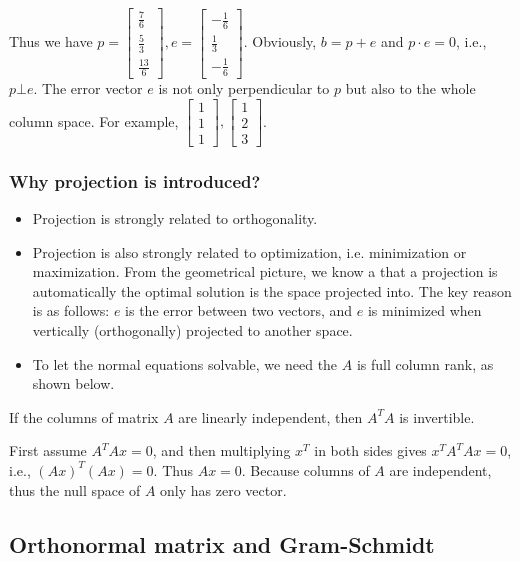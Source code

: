 \documentclass[11pt]{article}
\providecommand{\tightlist}{%
      \setlength{\itemsep}{0pt}\setlength{\parskip}{0pt}}
\begin{document}
Thus we have
\(p=\begin{bmatrix}\frac{7}{6}\\\frac{5}{3}\\\frac{13}{6}\end{bmatrix}, e=\begin{bmatrix}-\frac{1}{6}\\\frac{1}{3}\\-\frac{1}{6}\end{bmatrix}\).
Obviously, \(b=p+e\) and \(p\cdot e=0\), i.e., \(p\bot e\). The error
vector \(e\) is not only perpendicular to \(p\) but also to the whole
column space. For example,
\(\begin{bmatrix}1\\1\\1\end{bmatrix}, \begin{bmatrix}1\\2\\3\end{bmatrix}\).

    \subsubsection{Why projection is
introduced?}\label{why-projection-is-introduced}

\begin{itemize}
\tightlist
\item
  Projection is strongly related to orthogonality.
\item
  Projection is also strongly related to optimization, i.e. minimization
  or maximization. From the geometrical picture, we know a that a
  projection is automatically the optimal solution is the space
  projected into. The key reason is as follows: \(e\) is the error
  between two vectors, and \(e\) is minimized when vertically
  (orthogonally) projected to another space.
\item
  To let the normal equations solvable, we need the \(A\) is full column
  rank, as shown below.
\end{itemize}

If the columns of matrix \(A\) are linearly independent, then \(A^TA\)
is invertible.

First assume \(A^TAx=0\), and then multiplying \(x^T\) in both sides
gives \(x^TA^TAx=0\), i.e., \((Ax)^T(Ax)=0\). Thus \(Ax=0\). Because
columns of \(A\) are independent, thus the null space of \(A\) only has
zero vector.

    \subsection{Orthonormal matrix and
Gram-Schmidt}\label{orthonormal-matrix-and-gram-schmidt}
\end{document}

